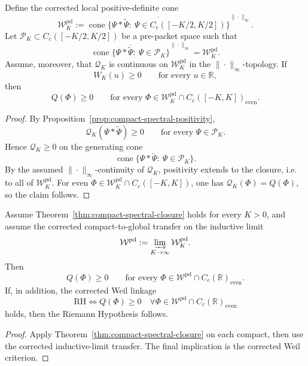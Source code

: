 \begin{theorem}\label{thm:compact-spectral-closure}
Define the corrected local positive-definite cone
\[
  \mathcal W_K^{\mathrm{pd}}
  :=
  \overline{
    \operatorname{cone}\{\Psi*\widetilde\Psi:\ \Psi\in C_c([-K/2,K/2])\}
  }^{\|\cdot\|_\infty}.
\]
Let $\mathcal P_K\subset C_c([-K/2,K/2])$ be a pre-packet space such that
\[
  \overline{
    \operatorname{cone}\{\Psi*\widetilde\Psi:\ \Psi\in\mathcal P_K\}
  }^{\|\cdot\|_\infty}
  =
  \mathcal W_K^{\mathrm{pd}}.
\]
Assume, moreover, that $\mathcal Q_K$ is continuous on
$\mathcal W_K^{\mathrm{pd}}$ in the $\|\cdot\|_\infty$-topology. If
\[
  W_K(u)\ge0
  \qquad\text{for every }u\in\mathbb R,
\]
then
\[
  Q(\Phi)\ge0
  \qquad\text{for every }\Phi\in
  \mathcal W_K^{\mathrm{pd}}\cap C_c([-K,K])_{\mathrm{even}}.
\]
\end{theorem}

\begin{proof}
By Proposition~\ref{prop:compact-spectral-positivity},
\[
  \mathcal Q_K(\Psi*\widetilde{\Psi})\ge0
  \qquad\text{for every }\Psi\in \mathcal P_K.
\]
Hence $\mathcal Q_K\ge0$ on the generating cone
\[
  \operatorname{cone}\{\Psi*\widetilde\Psi:\ \Psi\in\mathcal P_K\}.
\]
By the assumed $\|\cdot\|_\infty$-continuity of $\mathcal Q_K$, positivity
extends to the closure, i.e. to all of $\mathcal W_K^{\mathrm{pd}}$. For even
$\Phi\in \mathcal W_K^{\mathrm{pd}}\cap C_c([-K,K])$, one has
$\mathcal Q_K(\Phi)=Q(\Phi)$, so the claim follows.
\end{proof}

\begin{corollary}\label{cor:compact-spectral-global-closure}
Assume Theorem~\ref{thm:compact-spectral-closure} holds for every $K>0$, and
assume the corrected compact-to-global transfer on the inductive limit
\[
  \mathcal W^{\mathrm{pd}}:=\varinjlim_{K\to\infty}\mathcal W_K^{\mathrm{pd}}.
\]
Then
\[
  Q(\Phi)\ge0
  \qquad
  \text{for every }\Phi\in \mathcal W^{\mathrm{pd}}\cap C_c(\mathbb R)_{\mathrm{even}}.
\]
If, in addition, the corrected Weil linkage
\[
  \mathrm{RH}
  \Longleftrightarrow
  Q(\Phi)\ge0
  \quad
  \forall \Phi\in \mathcal W^{\mathrm{pd}}\cap C_c(\mathbb R)_{\mathrm{even}}
\]
holds, then the Riemann Hypothesis follows.
\end{corollary}

\begin{proof}
Apply Theorem~\ref{thm:compact-spectral-closure} on each compact, then use the
corrected inductive-limit transfer. The final implication is the corrected
Weil criterion.
\end{proof}

